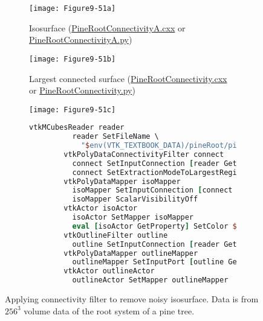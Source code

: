 \begin{figure}[htb]
    \centering
	\begin{subfigure}[h]{0.48\linewidth}
		\texttt{[image: Figure9-51a]}
		\captionsetup{justification=centering}
		\caption{Isosurface (\href{https://lorensen.github.io/VTKExamples/site/Cxx/VisualizationAlgorithms/PineRootConnectivityA/}{PineRootConnectivityA.cxx} or \href{https://lorensen.github.io/VTKExamples/site/Python/VisualizationAlgorithms/PineRootConnectivityA/}{PineRootConnectivityA.py})}
		\label{fig:Figure9-51a}
	\end{subfigure}
	\hfill
	\begin{subfigure}[h]{0.48\linewidth}
		\texttt{[image: Figure9-51b]}
		\captionsetup{justification=centering}
		\caption{Largest connected surface (\href{https://lorensen.github.io/VTKExamples/site/Cxx/VisualizationAlgorithms/PineRootConnectivity/}{PineRootConnectivity.cxx} or \href{https://lorensen.github.io/VTKExamples/site/Python/VisualizationAlgorithms/PineRootConnectivity/}{PineRootConnectivity.py})}
        \label{fig:Figure9-51b}
	\end{subfigure}
	\hfill
	\begin{subfigure}[h]{0.96\linewidth}
		\texttt{[image: Figure9-51c]}
		\captionsetup{justification=centering}
		\caption*{}
        \label{fig:Figure9-51c}
	\end{subfigure}
	\begin{subfigure}[h]{0.96\linewidth}
        \begin{lstlisting}[language=TCL,  caption={}, numbers=none, frame=none]
        vtkMCubesReader reader
          reader SetFileName \
            "$env(VTK_TEXTBOOK_DATA)/pineRoot/pine_root.tri"
        vtkPolyDataConnectivityFilter connect
          connect SetInputConnection [reader GetOutputPort]
          connect SetExtractionModeToLargestRegion
        vtkPolyDataMapper isoMapper
          isoMapper SetInputConnection [connect GetOutputPort]
          isoMapper ScalarVisibilityOff
        vtkActor isoActor
          isoActor SetMapper isoMapper
          eval [isoActor GetProperty] SetColor $raw_sienna
        vtkOutlineFilter outline
          outline SetInputConnection [reader GetOutputPort]
        vtkPolyDataMapper outlineMapper
          outlineMapper SetInputPort [outline GetOutputPort]
        vtkActor outlineActor
          outlineActor SetMapper outlineMapper
        \end{lstlisting}
        \label{fig:Figure9-51d}
	\end{subfigure}
	\caption{Applying connectivity filter to remove noisy isosurface. Data is from $256^3$ volume data of the root system of a pine tree.}\label{fig:Figure9-51}
\end{figure}

